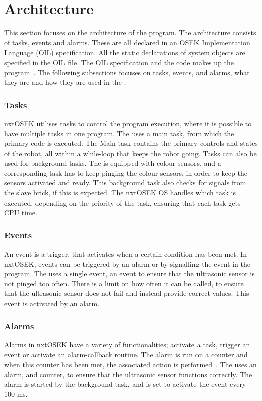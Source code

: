 \section{Architecture} \label{sec:architecture}
This section focuses on the architecture of the program. The architecture consists of tasks, events and alarms. These are all declared in an OSEK Implementation Language (OIL) specification. All the static declarations of system objects are specified in the OIL file. The OIL specification and the code makes up the program~\citep{nxtOSEK2}. The following subsections focuses on tasks, events, and alarms, what they are and how they are used in the \projname{}.

\subsubsection{Tasks} \label{sec:tasks}
nxtOSEK utilises tasks to control the program execution, where it is possible to have multiple tasks in one program. The \projname{} uses a main task, from which the primary code is executed. The Main task contains the primary controls and states of the robot, all within a while-loop that keeps the robot going. Tasks can also be used for background tasks. The \projname{} is equipped with colour sensors, and a corresponding task has to keep pinging the colour sensors, in order to keep the sensors activated and ready. This background task also checks for signals from the slave brick, if this is expected. The nxtOSEK OS handles which task is executed, depending on the priority of the task, ensuring that each task gets CPU time.

\subsubsection{Events} \label{sec:events}
An event is a trigger, that activates when a certain condition has been met. In nxtOSEK, events can be triggered by an alarm or by signalling the event in the program. The \projname{} uses a single event, an event to ensure that the ultrasonic sensor is not pinged too often. There is a limit on how often it can be called, to ensure that the ultrasonic sensor does not fail and instead provide correct values. This event is activated by an alarm. 

\subsubsection{Alarms} \label{sec:alarms}
Alarms in nxtOSEK have a variety of functionalities; activate a task, trigger an event or activate an alarm-callback routine. The alarm is run on a counter and when this counter has been met, the associated action is performed~\citep{osekoil}. The \projname{} uses an alarm, and counter, to ensure that the ultrasonic sensor functions correctly. The alarm is started by the background task, and is set to activate the event every 100 ms. 







